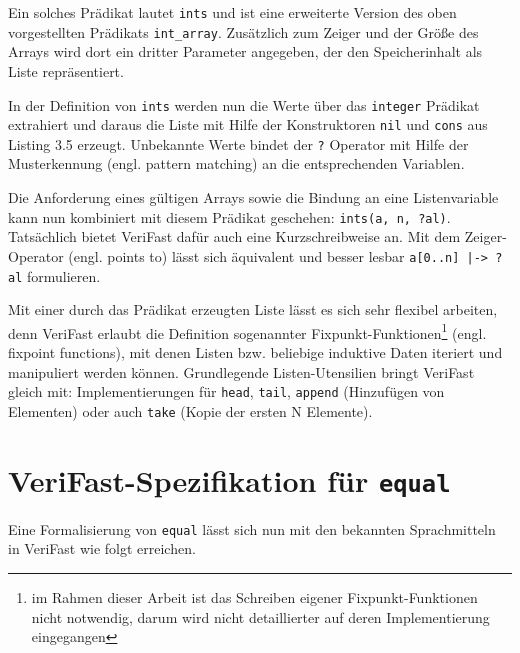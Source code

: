 

Ein solches Prädikat lautet \lstinline{ints} und ist eine erweiterte Version des oben vorgestellten Prädikats
\lstinline{int_array}. Zusätzlich zum Zeiger und der Größe des Arrays wird dort ein dritter Parameter angegeben, der
den Speicherinhalt als Liste repräsentiert. 



In der Definition von \lstinline{ints} werden nun die Werte über das \lstinline{integer} Prädikat extrahiert und
daraus die Liste mit Hilfe der Konstruktoren \lstinline{nil} und \lstinline{cons} aus Listing 3.5 erzeugt. Unbekannte
Werte bindet der \lstinline{?} Operator mit Hilfe der Musterkennung (engl. pattern matching) an die entsprechenden
Variablen.

Die Anforderung eines gültigen Arrays sowie die Bindung an eine Listenvariable kann nun kombiniert mit diesem Prädikat
geschehen: \lstinline{ints(a, n, ?al)}. Tatsächlich bietet VeriFast dafür auch eine Kurzschreibweise an. Mit dem Zeiger-Operator
(engl. points to) lässt sich äquivalent und besser lesbar \lstinline{a[0..n] |-> ?al} formulieren.

Mit einer durch das Prädikat erzeugten Liste lässt es sich sehr flexibel arbeiten, denn VeriFast erlaubt 
die Definition sogenannter Fixpunkt-Funktionen\footnote{im Rahmen dieser Arbeit ist das Schreiben eigener
Fixpunkt-Funktionen nicht notwendig, darum wird nicht detaillierter auf deren Implementierung eingegangen} (engl. fixpoint functions), 
mit denen Listen bzw. beliebige induktive Daten iteriert und manipuliert werden können. Grundlegende
Listen-Utensilien bringt VeriFast gleich mit: Implementierungen für \lstinline{head}, 
\lstinline{tail}, \lstinline{append} (Hinzufügen von Elementen) oder auch \lstinline{take} 
(Kopie der ersten N Elemente).


\section{VeriFast-Spezifikation für \texttt{equal}}
\label{sec:design-by-contract:VeriFast-variante}

Eine Formalisierung von \texttt{equal} lässt sich nun mit den bekannten Sprachmitteln in VeriFast wie folgt
erreichen.

